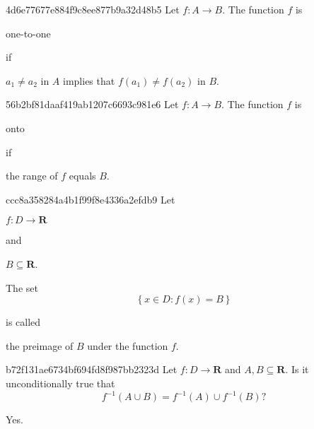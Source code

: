 \begin{note}{4d6e77677e884f9c8ee877b9a32d48b5}
    Let \({ f : A \to B }\). The function \({ f }\) is \begin{icloze}{2}one-to-one\end{icloze} if
    \begin{icloze}{1}
        \begin{center}
            \({ a_1 \neq a_2 }\) in \({ A }\) implies that \({ f(a_1) \neq f(a_2) }\) in \({ B }\).
        \end{center}
    \end{icloze}
\end{note}

\begin{note}{56b2bf81daaf419ab1207c6693c981e6}
    Let \({ f : A \to B }\). The function \({ f }\) is \begin{icloze}{2}onto\end{icloze} if
    \begin{icloze}{1}
        \begin{center}
            the range of \({ f }\) equals \({ B }\).
        \end{center}
    \end{icloze}
\end{note}

\begin{note}{ccc8a358284a4b1f99f8e4336a2efdb9}
    Let \begin{icloze}{4}\({ f : D \to \mathbf{R} }\)\end{icloze} and \begin{icloze}{3}\({ B \subseteq \mathbf{R} }\).\end{icloze}
    \begin{icloze}{2}
        The set
        \[
            \left\{ x \in D : f(x) = B \right\}
        \]
    \end{icloze}
    is called \begin{icloze}{1}the preimage of \({ B }\) under the function \({ f }\).\end{icloze}
\end{note}

\begin{note}{b72f131ae6734bf694fd8f987bb2323d}
    Let \({ f : D \to \mathbf{R} }\) and \({ A, B \subseteq \mathbf{R} }\).
    Is it unconditionally true that
    \[
        f^{-1}(A \cup B) = f^{-1}(A) \cup f^{-1}(B)?
    \]

    \begin{cloze}{1}
        Yes.
    \end{cloze}
\end{note}

